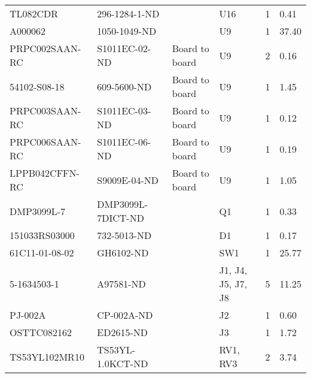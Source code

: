 \begin{tabular}{llllll}
TL082CDR            & 296-1284-1-ND            &                & U16                                                                       & 1    & 0.41   \\
A000062             & 1050-1049-ND             &                & U9                                                                        & 1    & 37.40  \\
PRPC002SAAN-RC      & S1011EC-02-ND            & Board to board & U9                                                                        & 2    & 0.16   \\
54102-S08-18        & 609-5600-ND              & Board to board & U9                                                                        & 1    & 1.45   \\
PRPC003SAAN-RC      & S1011EC-03-ND            & Board to board & U9                                                                        & 1    & 0.12   \\
PRPC006SAAN-RC      & S1011EC-06-ND            & Board to board & U9                                                                        & 1    & 0.19   \\
LPPB042CFFN-RC      & S9009E-04-ND             & Board to board & U9                                                                        & 1    & 1.05   \\
DMP3099L-7          & DMP3099L-7DICT-ND        &                & Q1                                                                        & 1    & 0.33   \\
151033RS03000       & 732-5013-ND              &                & D1                                                                        & 1    & 0.17   \\
61C11-01-08-02      & GH6102-ND                &                & SW1                                                                       & 1    & 25.77  \\
5-1634503-1         & A97581-ND                &                & J1, J4, J5, J7, J8                                                        & 5    & 11.25  \\
PJ-002A             & CP-002A-ND               &                & J2                                                                        & 1    & 0.60   \\
OSTTC082162         & ED2615-ND                &                & J3                                                                        & 1    & 1.72   \\
TS53YL102MR10       & TS53YL-1.0KCT-ND         &                & RV1, RV3                                                                  & 2    & 3.74   \\

\end{tabular}
